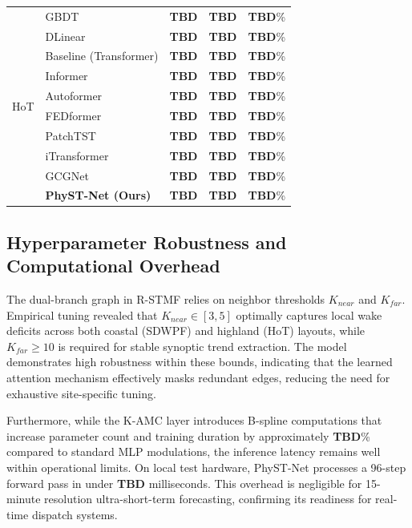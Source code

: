 \begin{table}[htbp]
\begin{tabular}{@{}llccc@{}}
\midrule
\multirow{10}{*}{HoT} & GBDT & \textbf{TBD} & \textbf{TBD} & \textbf{TBD}\% \\
 & DLinear & \textbf{TBD} & \textbf{TBD} & \textbf{TBD}\% \\
 & Baseline (Transformer) & \textbf{TBD} & \textbf{TBD} & \textbf{TBD}\% \\
 & Informer & \textbf{TBD} & \textbf{TBD} & \textbf{TBD}\% \\
 & Autoformer & \textbf{TBD} & \textbf{TBD} & \textbf{TBD}\% \\
 & FEDformer & \textbf{TBD} & \textbf{TBD} & \textbf{TBD}\% \\
 & PatchTST & \textbf{TBD} & \textbf{TBD} & \textbf{TBD}\% \\
 & iTransformer & \textbf{TBD} & \textbf{TBD} & \textbf{TBD}\% \\
 & GCGNet & \textbf{TBD} & \textbf{TBD} & \textbf{TBD}\% \\
 & \textbf{PhyST-Net (Ours)} & \textbf{TBD} & \textbf{TBD} & \textbf{TBD}\% \\
\bottomrule
\end{tabular}
\end{table}

\subsection{Hyperparameter Robustness and Computational Overhead}
\label{sec:hyperparams}
The dual-branch graph in R-STMF relies on neighbor thresholds $K_{near}$ and $K_{far}$. Empirical tuning revealed that $K_{near} \in [3, 5]$ optimally captures local wake deficits across both coastal (SDWPF) and highland (HoT) layouts, while $K_{far} \ge 10$ is required for stable synoptic trend extraction. The model demonstrates high robustness within these bounds, indicating that the learned attention mechanism effectively masks redundant edges, reducing the need for exhaustive site-specific tuning.

Furthermore, while the K-AMC layer introduces B-spline computations that increase parameter count and training duration by approximately \textbf{TBD}\% compared to standard MLP modulations, the inference latency remains well within operational limits. On local test hardware, PhyST-Net processes a 96-step forward pass in under \textbf{TBD} milliseconds. This overhead is negligible for 15-minute resolution ultra-short-term forecasting, confirming its readiness for real-time dispatch systems.


